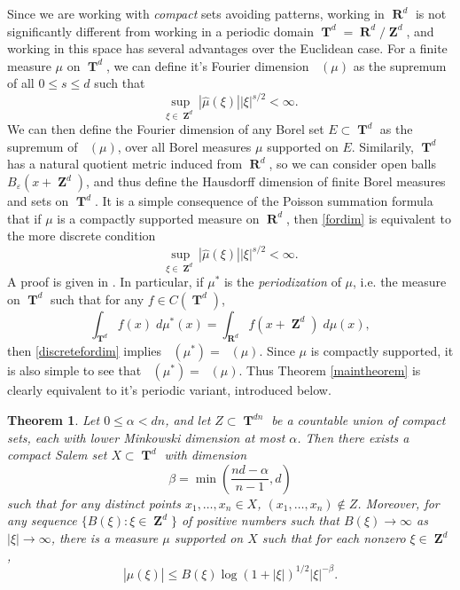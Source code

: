 \documentclass[12pt,reqno]{article}
\numberwithin{equation}{section}
\DeclareMathOperator{\hausdim}{\dim_{\mathbf{H}}}
\DeclareMathOperator{\fordim}{\dim_{\mathbf{F}}}
\DeclareMathOperator{\RR}{\mathbf{R}}
\DeclareMathOperator{\ZZ}{\mathbf{Z}}
\DeclareMathOperator{\TT}{\mathbf{T}}
\newtheorem{theorem}{Theorem}
\begin{document}
Since we are working with \emph{compact} sets avoiding patterns, working in $\RR^d$ is not significantly different from working in a periodic domain $\TT^d = \RR^d / \ZZ^d$, and working in this space has several advantages over the Euclidean case. For a finite measure $\mu$ on $\TT^d$, we can define it's Fourier dimension $\fordim(\mu)$ as the supremum of all $0 \leq s \leq d$ such that
%
\begin{equation} \label{fordimtorus}
    \sup_{\xi \in \ZZ^d} |\widehat{\mu}(\xi)| |\xi|^{s/2} < \infty.
\end{equation}
%
We can then define the Fourier dimension of any Borel set $E \subset \TT^d$ as the supremum of $\fordim(\mu)$, over all Borel measures $\mu$ supported on $E$. Similarily, $\TT^d$ has a natural quotient metric induced from $\RR^d$, so we can consider open balls $B_\varepsilon(x + \ZZ^d)$, and thus define the Hausdorff dimension of finite Borel measures and sets on $\TT^d$. It is a simple consequence of the Poisson summation formula that if $\mu$ is a compactly supported measure on $\RR^d$, then \eqref{fordim} is equivalent to the more discrete condition
%
\begin{equation} \label{discretefordim}
    \sup_{\xi \in \ZZ^d} |\widehat{\mu}(\xi)| |\xi|^{s/2} < \infty.
\end{equation}
%
A proof is given in \cite[Lemma 39]{myThesis}. In particular, if $\mu^*$ is the \emph{periodization} of $\mu$, i.e. the measure on $\TT^d$ such that for any $f \in C(\TT^d)$,
%
\[ \int_{\TT^d} f(x)\; d\mu^*(x) = \int_{\RR^d} f(x + \ZZ^d)\; d\mu(x), \]
%
then \eqref{discretefordim} implies $\fordim(\mu^*) = \fordim(\mu)$. Since $\mu$ is compactly supported, it is also simple to see that $\hausdim(\mu^*) = \hausdim(\mu)$. Thus Theorem \ref{maintheorem} is clearly equivalent to it's periodic variant, introduced below.

\begin{theorem} \label{periodictheorem}
    Let $0 \leq \alpha < dn$, and let $Z \subset \TT^{dn}$ be a countable union of compact sets, each with lower Minkowski dimension at most $\alpha$. Then there exists a compact Salem set $X \subset \TT^d$ with dimension
    \[ \beta = \min \left( \frac{nd - \alpha}{n-1}, d \right) \]
    such that for any distinct points $x_1, \dots, x_n \in X$, $(x_1, \dots, x_n) \not \in Z$. Moreover, for any sequence $\{ B(\xi) : \xi \in \ZZ^d \}$ of positive numbers such that $B(\xi) \to \infty$ as $|\xi| \to \infty$, there is a measure $\mu$ supported on $X$ such that for each nonzero $\xi \in \ZZ^d$,
    \[ |\widehat{\mu}(\xi)| \leq B(\xi) \log(1 + |\xi|)^{1/2} |\xi|^{-\beta}. \]
\end{theorem}
\end{document}
